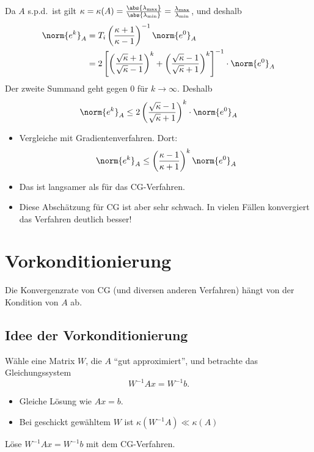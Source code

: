 Da $A$ s.p.d.\ ist gilt $\kappa = \kappa(A) = \frac{\abs{\lambda_\text{max}}}{\abs{\lambda_\text{min}}}
  = \frac{\lambda_\text{max}}{\lambda_\text{min}}$, und deshalb
\begin{align*}
 \norm{e^k}_A
 & =
 T_i \left(\frac{\kappa +1}{\kappa -1} \right)^{-1} \norm{e^0}_A \\
 & =
 2 \left[ \left( \frac{\sqrt{\kappa}+1}{\sqrt{\kappa}-1} \right)^k
         +\left( \frac{\sqrt{\kappa}-1}{\sqrt{\kappa}+1} \right)^k \right]^{-1} \cdot \norm{e^0}_A
\end{align*}
Der zweite Summand geht gegen $0$ für $k \to \infty$.  Deshalb
\begin{align*}
 \norm{e^k}_A \leq 2 \left( \frac{\sqrt{\kappa}-1}{\sqrt{\kappa}+1} \right)^k \cdot \norm{e^0}_A
\end{align*}
\begin{itemize}
 \item Vergleiche mit Gradientenverfahren. Dort:
  \begin{equation*}
   \norm{e^k}_A \leq \left(\frac{\kappa -1}{\kappa +1} \right)^k \norm{e^0}_A
  \end{equation*}
 \item Das ist langsamer als für das CG-Verfahren.
 \item Diese Abschätzung für CG ist aber sehr schwach. In vielen Fällen konvergiert das Verfahren deutlich besser!
\end{itemize}


\section{Vorkonditionierung}

Die Konvergenzrate von CG (und diversen anderen Verfahren) hängt von der Kondition von $A$ ab.

\subsection{Idee der Vorkonditionierung}

Wähle eine Matrix $W$, die $A$ "`gut approximiert"', und betrachte das Gleichungssystem
\begin{equation*}
 W^{-1}Ax=W^{-1}b.
\end{equation*}

\begin{itemize}
 \item Gleiche Lösung wie $Ax=b$.
 \item Bei geschickt gewähltem $W$ ist $\kappa \left(W^{-1}A \right) \ll \kappa (A)$
\end{itemize}
Löse $W^{-1}Ax=W^{-1}b$ mit dem CG-Verfahren.

